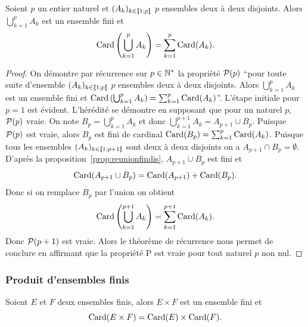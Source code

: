 \begin{prop}
  Soient \(p\) un entier naturel et \((A_k)_{k\in\intervalleentier{1}{p}}\)
  \(p\) ensembles deux à deux disjoints. Alors \(\bigcup_{k = 1}^{p}A_k\) est un
  ensemble fini et
  \begin{equation}
    \Card\left(\bigcup_{k = 1}^{p}A_k\right) = \sum_{k = 1}^{p}\Card(A_k).
  \end{equation}
\end{prop}

\begin{proof}
  On démontre par récurrence sur \(p\in \N^*\) la propriété \(\P(p)\) ``pour
  toute suite d'ensemble \((A_k)_{k\in\intervalleentier{1}{p}}\) \(p\) ensembles
  deux à deux disjoints. Alors \(\bigcup_{k = 1}^{p}A_k\) est un ensemble fini
  et \(\Card\left(\bigcup_{k = 1}^{p}A_k\right) = \sum_{k =
  1}^{p}\Card(A_k)\)''. L'étape initiale pour \(p = 1\) est évident. L'hérédité
  se démontre en supposant que pour un naturel \(p\), \(\P(p)\) vraie. On note
  \(B_p = \bigcup_{k = 1}^{p}A_k\) et donc \(\bigcup_{k = 1}^{p + 1}A_k = A_{p +
  1}\cup B_p\). Puisque \(\P(p)\) est vraie, alors \(B_p\) est fini de cardinal
  \(\Card(B_p) = \sum_{k = 1}^{p}\Card(A_k)\). Puisque tous les ensembles
  \((A_k)_{k\in\intervalleentier{1}{p + 1}}\) sont deux à deux disjoints on a
  \(A_{p + 1}\cap B_p = \emptyset\). D'après la
  proposition~\ref{prop:reunionfindis}, \(A_{p + 1}\cup B_p\) est fini et
  \begin{equation}
    \Card(A_{p + 1}\cup B_p) = \Card(A_{p + 1}) + \Card(B_p).
  \end{equation}
  Donc si on remplace \(B_p\) par l'union on obtient
  \begin{equation}
    \Card\left(\bigcup_{k = 1}^{p + 1}A_k\right) = \sum_{k = 1}^{p +
    1}\Card(A_k).
  \end{equation}
  Donc \(\P(p + 1)\) est vraie. Alors le théorème de récurrence nous permet de
  conclure en affirmant que la propriété P est vraie pour tout naturel \(p\) non
  nul.
\end{proof}

\subsubsection{Produit d'ensembles finis}

\begin{prop}
  \label{prop:produitfini}
  Soient \(E\) et \(F\) deux ensembles finis, alors \(E\times F\) est un
  ensemble fini et
  \begin{equation}
    \Card(E\times F) = \Card(E)\times \Card(F).
  \end{equation}
\end{prop}

